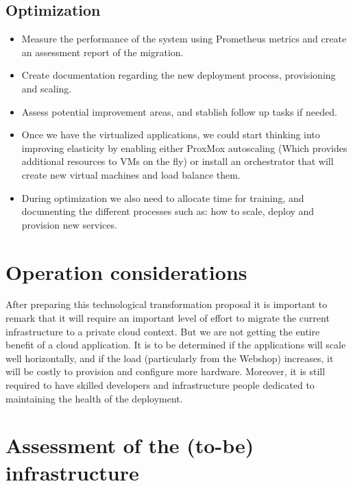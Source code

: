 \documentclass{llncs}
\begin{document}
\subsection{Optimization}

\begin{itemize}
  \item Measure the performance of the system using Prometheus metrics and create an assessment report of the migration.
        
  \item Create documentation regarding the new deployment process, provisioning and scaling.
        
  \item Assess potential improvement areas, and stablish follow up tasks if needed.
        
  \item Once we have the virtualized applications, we could start thinking into improving elasticity by enabling either ProxMox autoscaling (Which provides additional resources to VMs on the fly) or install an orchestrator that will create new virtual machines and load balance them.
        
  \item During optimization we also need to allocate time for training, and documenting the different processes such as: how to scale, deploy and provision new services.
\end{itemize}

\section{Operation considerations}

After preparing this technological transformation proposal it is important to remark that it will require an important level of effort to migrate the current infrastructure to a private cloud context. But we are not getting the entire benefit of a cloud application. It is to be determined if the applications will scale well horizontally, and if the load (particularly from the Webshop) increases, it will be costly to provision and configure more hardware. Moreover, it is still required to have skilled developers and infrastructure people dedicated to maintaining the health of the deployment.  

\section{Assessment of the (to-be) infrastructure}
\end{document}
